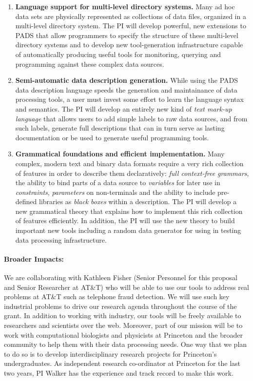 \begin{enumerate}
\item {\bf Language support for multi-level directory systems.}
Many ad hoc data sets are physically represented as collections of 
data files, organized in a multi-level directory system.
The PI will develop powerful, new extensions to PADS that allow programmers
to specify the structure of these multi-level directory systems
and to develop new tool-generation infrastructure capable of
automatically producing useful tools for monitoring, querying and programming
against these complex data sources.
\item {\bf Semi-automatic data description generation.}
While using the PADS data description language speeds the generation
and maintainance of data processing tools, a user must invest some effort
to learn the language syntax and semantics.  The PI will develop 
an entirely new kind of {\em text mark-up language} that allows users to add simple
labels to raw data sources, and from such labels, generate full descriptions
that can in turn serve as lasting documentation or be used to generate useful
programming tools.
\item {\bf Grammatical foundations and efficient implementation.}  
Many complex, modern text and binary data formats require a very rich collection
of features in order to describe them declaratively:  
{\em full context-free grammars}, the ability to bind 
parts of a data source to {\em variables} for later use in
{\em constraints}, {\em parameters} on non-terminals and the
ability to include pre-defined libraries as {\em black boxes} 
within a description.  The PI will develop a new grammatical 
theory that explains how to implement this rich collection of features
efficiently.  In addition, the PI will use the new theory to build
important new tools including a random data generator for using
in testing data processing infrastructure.
\end{enumerate}

\paragraph*{Broader Impacts:}  We are collaborating with Kathleen Fisher
(Senior Personnel for this proposal and Senior Researcher at AT\&T)
who will be able to use our tools to address real problems at AT\&T such
as telephone fraud detection.  We will use such key industrial problems
to drive our research agenda throughout the course of the grant.
In addition to working with industry, our tools will be freely
available to researchers and scientists over the web.  Moreover, part
of our mission will be to work with computational biologists and
physicists at Princeton and the broader community to help them with
their data processing needs.  One way that we plan to do so is to
develop interdisciplinary research projects for Princeton's 
undergraduates.  As independent research co-ordinator at Princeton
for the last two years, PI Walker has the experience and track record
to make this work.

